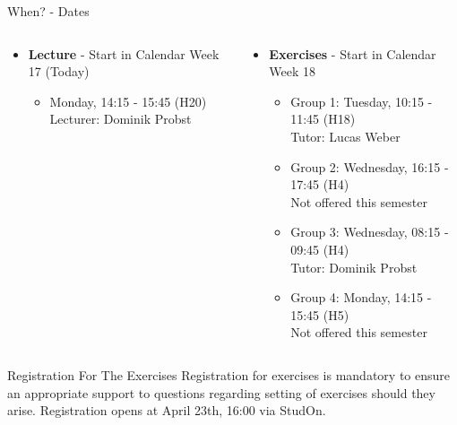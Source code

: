 \begin{frame}{When? - Dates}
	\begin{columns}
		\begin{column}{0.5\textwidth}
			\begin{itemize}
				\item \textbf{Lecture} - Start in Calendar Week 17 (Today)
				      \begin{itemize}
					      \item Monday, 14:15 - 15:45 (H20) \\
					            {\color{gray}Lecturer: Dominik Probst}
				      \end{itemize}
			\end{itemize}
		\end{column}

		\begin{column}{0.5\textwidth}
			\begin{itemize}
				\item \textbf{Exercises} - Start in Calendar Week 18
				      \begin{itemize}
					      \item Group 1: Tuesday, 10:15 - 11:45 (H18) \\
					            {\color{gray}Tutor: Lucas Weber}
					      \item Group 2: Wednesday, 16:15 - 17:45 (H4) \\
					            {\color{red}Not offered this semester}
					      \item Group 3: Wednesday, 08:15 - 09:45 (H4) \\
					            {\color{gray}Tutor: Dominik Probst}
					      \item Group 4: Monday, 14:15 - 15:45 (H5) \\
					            {\color{red}Not offered this semester}
				      \end{itemize}
			\end{itemize}
		\end{column}
	\end{columns}

	\begin{block}{Registration For The Exercises}
		Registration for exercises is mandatory to ensure an appropriate support to questions regarding setting of exercises should they arise.
			{\color{faured}Registration opens at April 23th, 16:00 via StudOn.}
	\end{block}
\end{frame}

